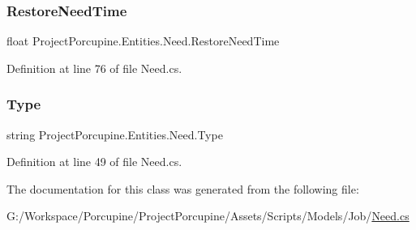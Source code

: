 \subsubsection{\texorpdfstring{Restore\+Need\+Time}{RestoreNeedTime}}
{\footnotesize\ttfamily float Project\+Porcupine.\+Entities.\+Need.\+Restore\+Need\+Time\hspace{0.3cm}{\ttfamily [get]}}



Definition at line 76 of file Need.\+cs.

\mbox{\label{class_project_porcupine_1_1_entities_1_1_need_aebf1aa4bc780aa29f0d99b3b108d5d34}} 
\subsubsection{\texorpdfstring{Type}{Type}}
{\footnotesize\ttfamily string Project\+Porcupine.\+Entities.\+Need.\+Type\hspace{0.3cm}{\ttfamily [get]}}



Definition at line 49 of file Need.\+cs.



The documentation for this class was generated from the following file\+:\begin{DoxyCompactItemize}
\item 
G\+:/\+Workspace/\+Porcupine/\+Project\+Porcupine/\+Assets/\+Scripts/\+Models/\+Job/\hyperlink{_need_8cs}{Need.\+cs}\end{DoxyCompactItemize}
